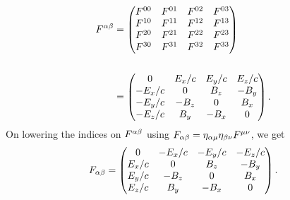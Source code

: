\begin{align}\label{ved.32x}
F^{{\alpha}{\beta}}&=  \begin{pmatrix}
F^{00} & F^{01} & F^{02} & F^{03}\\
F^{10} & F^{11} & F^{12} & F^{13}\\
F^{20} & F^{21} & F^{22} & F^{23}\\
F^{30} & F^{31} & F^{32} & F^{33}\\\end{pmatrix}
\notag\\\notag\\
&=\begin{pmatrix}
 0  & E_x/c & E_y/c & E_z/c\\
-E_x/c & 0  & B_z  & -B_y\\
-E_y/c & - B_z  & 0   & B_x\\
-E_z/c & B_y  & -B_x  & 0\\
\end{pmatrix}.
\end{align}
On lowering the indices on $F^{{\alpha}{\beta}}$ using
$F_{{\alpha}{\beta}}=\eta_{{\alpha}{\mu}}\eta_{{\beta}{\nu}}
F^{{\mu}{\nu}}$, we get\\
\begin{align}\label{ved.33x}
F_{{\alpha}{\beta}}=\begin{pmatrix}
 0  & -E_x/c & -E_y/c & -E_z/c\\
E_x/c & 0  & B_z  & -B_y\\
E_y/c & - B_z  & 0   & B_x\\
E_z/c & B_y  & -B_x  & 0\\
\end{pmatrix}.
\end{align}

